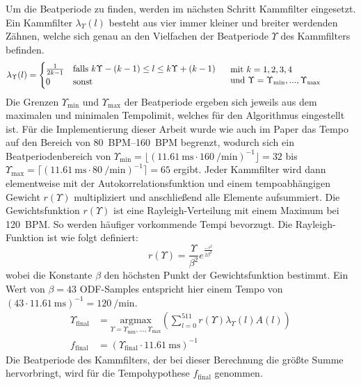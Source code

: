 {{{			%
			Um die Beatperiode zu finden,
				werden im nächsten Schritt Kammfilter eingesetzt.
			Ein Kammfilter $\lambda_\Upsilon(l)$ besteht aus vier immer kleiner und breiter werdenden Zähnen,
				welche sich genau an den Vielfachen der Beatperiode $\Upsilon$ des Kammfilters befinden.
			\begin{equation}
				\lambda_\Upsilon(l) =
				\begin{cases}
					\frac{1}{2k - 1} & \text{falls } k \Upsilon - (k - 1) \leq l \leq k \Upsilon + (k - 1) \\
					0 & \text{sonst}
				\end{cases}
				\hspace{5mm}
				\text{\parbox[c]{5cm}{
					mit $k = 1, 2, 3, 4$ \\
					und $\Upsilon = \Upsilon_\text{min}, ..., \Upsilon_\text{max}$
				}}
			\end{equation}
			Die Grenzen $\Upsilon_\text{min}$ und $\Upsilon_\text{max}$ der Beatperiode ergeben sich jeweils aus dem maximalen und minimalen Tempolimit,
				welches für den Algorithmus eingestellt ist.
			Für die Implementierung dieser Arbeit wurde
				wie auch im Paper
				das Tempo auf den Bereich von \SIrange{80}{160}{BPM} begrenzt,
				wodurch sich ein Beatperiodenbereich
				von $\Upsilon_\text{min} = \lfloor(\SI{11.61}{\milli\second} \cdot \SI{160}{\per\minute})^{-1}\rfloor = 32$
				bis $\Upsilon_\text{max} = \lceil(\SI{11.61}{\milli\second} \cdot \SI{80}{\per\minute})^{-1}\rceil = 65$
				ergibt.
			Jeder Kammfilter wird dann elementweise mit der Autokorrelationsfunktion und einem tempoabhängigen Gewicht $r(\Upsilon)$ multipliziert
				und anschlie{\ss}end alle Elemente aufsummiert.
			Die Gewichtsfunktion $r(\Upsilon)$ ist eine Rayleigh-Verteilung mit einem Maximum bei \SI{120}{BPM}.
			So werden häufiger vorkommende Tempi bevorzugt.
			Die Rayleigh-Funktion ist wie folgt definiert:
			\begin{equation}
				r(\Upsilon) = \frac{\Upsilon}{\beta^2}e^{\frac{-\tau^2}{2\beta^2}}
			\end{equation}
			wobei die Konstante $\beta$ den höchsten Punkt der Gewichtsfunktion bestimmt.
			Ein Wert von $\beta = 43$ ODF-Samples entspricht hier einem Tempo von
				$(43 \cdot \SI{11.61}{\milli\second})^{-1} = \SI{120}{\per\minute}$.
			\begin{align}
				\Upsilon_\text{final} &=
					\underset{\Upsilon = \Upsilon_\text{min}, ..., \Upsilon_\text{max}}{\text{argmax}}
					\left( \sum_{l = 0}^{511} r(\Upsilon) \lambda_\Upsilon(l) A(l) \right) \\
				f_\text{final} &= (\Upsilon_\text{final} \cdot \SI{11.61}{\milli\second})^{-1}
			\end{align}
			Die Beatperiode des Kammfilters,
				der bei dieser Berechnung die grö{\ss}te Summe hervorbringt,
				wird für die Tempohypothese $f_\text{final}$ genommen.

}}}
